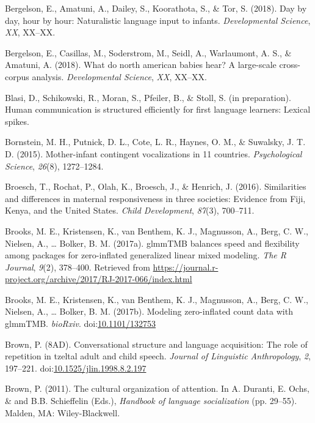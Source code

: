 \documentclass[floatsintext,man]{apa6}
\theoremstyle{definition}
\theoremstyle{definition}
\theoremstyle{definition}
\theoremstyle{remark}
\begin{document}
\hypertarget{ref-bergelson2018day}{}
Bergelson, E., Amatuni, A., Dailey, S., Koorathota, S., \& Tor, S.
(2018). Day by day, hour by hour: Naturalistic language input to
infants. \emph{Developmental Science}, \emph{XX}, XX--XX.

\hypertarget{ref-bergelsoncasillas2018what}{}
Bergelson, E., Casillas, M., Soderstrom, M., Seidl, A., Warlaumont, A.
S., \& Amatuni, A. (2018). What do north american babies hear? A
large-scale cross-corpus analysis. \emph{Developmental Science},
\emph{XX}, XX--XX.

\hypertarget{ref-blasiIPhuman}{}
Blasi, D., Schikowski, R., Moran, S., Pfeiler, B., \& Stoll, S. (in
preparation). Human communication is structured efficiently for first
language learners: Lexical spikes.

\hypertarget{ref-bornstein2015mother}{}
Bornstein, M. H., Putnick, D. L., Cote, L. R., Haynes, O. M., \&
Suwalsky, J. T. D. (2015). Mother-infant contingent vocalizations in 11
countries. \emph{Psychological Science}, \emph{26}(8), 1272--1284.

\hypertarget{ref-broesch2016similarities}{}
Broesch, T., Rochat, P., Olah, K., Broesch, J., \& Henrich, J. (2016).
Similarities and differences in maternal responsiveness in three
societies: Evidence from Fiji, Kenya, and the United States. \emph{Child
Development}, \emph{87}(3), 700--711.

\hypertarget{ref-R-glmmTMB}{}
Brooks, M. E., Kristensen, K., van Benthem, K. J., Magnusson, A., Berg,
C. W., Nielsen, A., \ldots{} Bolker, B. M. (2017a). glmmTMB balances
speed and flexibility among packages for zero-inflated generalized
linear mixed modeling. \emph{The R Journal}, \emph{9}(2), 378--400.
Retrieved from
\url{https://journal.r-project.org/archive/2017/RJ-2017-066/index.html}

\hypertarget{ref-brooks2017modeling}{}
Brooks, M. E., Kristensen, K., van Benthem, K. J., Magnusson, A., Berg,
C. W., Nielsen, A., \ldots{} Bolker, B. M. (2017b). Modeling
zero-inflated count data with glmmTMB. \emph{bioRxiv}.
doi:\href{https://doi.org/10.1101/132753}{10.1101/132753}

\hypertarget{ref-brown1998conversational}{}
Brown, P. (8AD). Conversational structure and language acquisition: The
role of repetition in tzeltal adult and child speech. \emph{Journal of
Linguistic Anthropology}, \emph{2}, 197--221.
doi:\href{https://doi.org/10.1525/jlin.1998.8.2.197}{10.1525/jlin.1998.8.2.197}

\hypertarget{ref-brown2011cultural}{}
Brown, P. (2011). The cultural organization of attention. In A. Duranti,
E. Ochs, \& and B.B. Schieffelin (Eds.), \emph{Handbook of language
socialization} (pp. 29--55). Malden, MA: Wiley-Blackwell.
\end{document}
